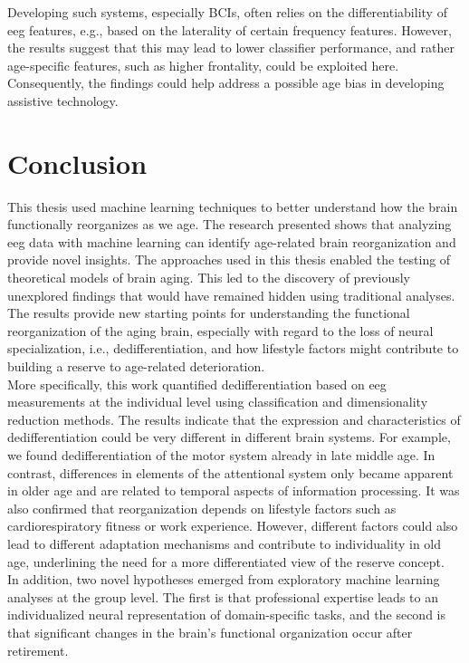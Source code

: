 Developing such systems, especially BCIs, often relies on the differentiability of \gls{eeg} features, e.g., based on the laterality of certain frequency features. However, the results suggest that this may lead to lower classifier performance, and rather age-specific features, such as higher frontality, could be exploited here. Consequently, the findings could help address a possible age bias in developing assistive technology.

\section{Conclusion}
This thesis used machine learning techniques to better understand how the brain functionally reorganizes as we age. The research presented shows that analyzing \gls{eeg} data with machine learning can identify age-related brain reorganization and provide novel insights. The approaches used in this thesis enabled the testing of theoretical models of brain aging. This led to the discovery of previously unexplored findings that would have remained hidden using traditional analyses. The results provide new starting points for understanding the functional reorganization of the aging brain, especially with regard to the loss of neural specialization, i.e., dedifferentiation, and how lifestyle factors might contribute to building a reserve to age-related deterioration.\\
More specifically, this work quantified dedifferentiation based on \gls{eeg} measurements at the individual level using classification and dimensionality reduction methods. The results indicate that the expression and characteristics of dedifferentiation could be very different in different brain systems. For example, we found dedifferentiation of the motor system already in late middle age. In contrast, differences in elements of the attentional system only became apparent in older age and are related to temporal aspects of information processing. It was also confirmed that reorganization depends on lifestyle factors such as cardiorespiratory fitness or work experience. However, different factors could also lead to different adaptation mechanisms and contribute to individuality in old age, underlining the need for a more differentiated view of the reserve concept.\\
In addition, two novel hypotheses emerged from exploratory machine learning analyses at the group level. The first is that professional expertise leads to an individualized neural representation of domain-specific tasks, and the second is that significant changes in the brain's functional organization occur after retirement.\\
